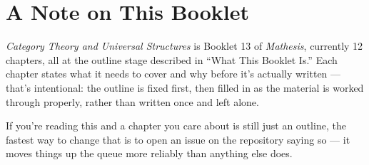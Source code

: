 \chapter*{A Note on This Booklet}

\textit{Category Theory and Universal Structures} is Booklet 13 of \textit{Mathesis}, currently 12 chapters, all at the outline stage described in ``What This Booklet Is.'' Each chapter states what it needs to cover and why before it's actually written --- that's intentional: the outline is fixed first, then filled in as the material is worked through properly, rather than written once and left alone.

If you're reading this and a chapter you care about is still just an outline, the fastest way to change that is to open an issue on the repository saying so --- it moves things up the queue more reliably than anything else does.
